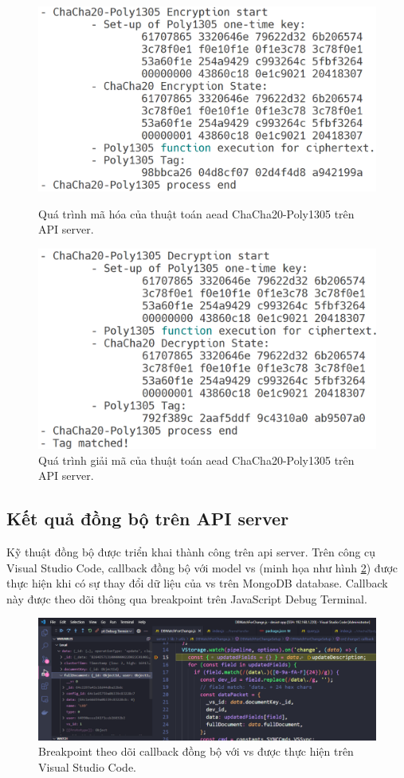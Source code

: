 \begin{figure}[htp]
\centering
\captionsetup{justification=centering,margin=2cm}
\includegraphics[width=0.7\linewidth, frame]{images/fig-CC20-P1305-En-Process-server.png}
\caption{Quá trình mã hóa của thuật toán \acrshort{aead} ChaCha20-Poly1305 trên API server.}
\label{fig:CC20-P1305-En-Process-server}
\includegraphics[width=0.7\linewidth, frame]{images/fig-CC20-P1305-De-Process-server.png}
\caption{Quá trình giải mã của thuật toán \acrshort{aead} ChaCha20-Poly1305 trên API server.}
\label{fig:CC20-P1305-De-Process-server}
\end{figure}

\subsection{Kết quả đồng bộ trên API server}

Kỹ thuật đồng bộ được triển khai thành công trên \acrshort{api} server. Trên công cụ Visual Studio Code, callback đồng bộ với model \acrshort{vs} (minh họa như hình \ref{fig:VS-callback-trig-server}) được thực hiện khi có sự thay đổi dữ liệu của \acrshort{vs} trên MongoDB database. Callback này được theo dõi thông qua breakpoint trên JavaScript Debug Terminal.

\begin{figure}[htp]
\centering
\captionsetup{justification=centering,margin=2cm}
\includegraphics[width=1.0\linewidth, frame]{images/fig-VS-callback-trig-server.png}
\caption{Breakpoint theo dõi callback đồng bộ với \acrshort{vs} được thực hiện trên Visual Studio Code.}
\label{fig:VS-callback-trig-server}
\end{figure}

